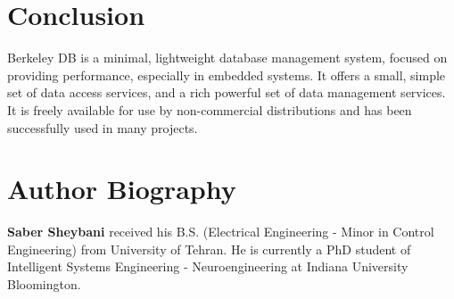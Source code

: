\documentclass[9pt,twocolumn,twoside]{../../styles/osajnl}
\begin{document}
\section{Conclusion}

Berkeley DB is a minimal, lightweight database management system, focused on providing 
performance, especially in embedded systems. It offers a small, simple set of data access 
services, and  a rich powerful set of data management services. It is freely available 
for use by non-commercial distributions and has been successfully used in many projects.



 
\section*{Author Biography}
\begingroup
\setlength\intextsep{0pt}
\begin{minipage}[t][3.2cm][t]{1.0\columnwidth} %
  \noindent
  {\bfseries Saber Sheybani} received his B.S. (Electrical Engineering - Minor in Control Engineering) from University of Tehran.  He is currently a PhD student of Intelligent Systems Engineering - Neuroengineering at Indiana University Bloomington.
\end{minipage}
\endgroup
\end{document}
